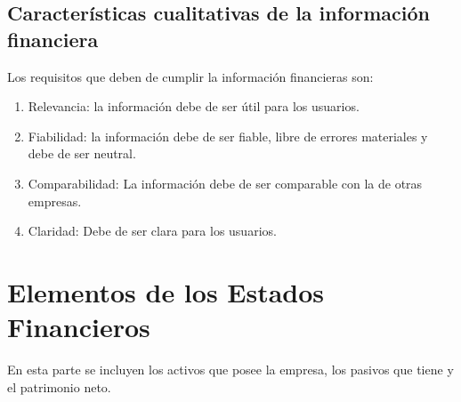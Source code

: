 \documentclass[a4paper,12pt]{article}
\begin{document}
\subsection{Características cualitativas de la información financiera}

Los requisitos que deben de cumplir la información financieras son:

\begin{enumerate}
    \item Relevancia: la información debe de ser útil para los usuarios.
    \item Fiabilidad: la información debe de ser fiable, libre de errores materiales y debe de ser neutral.
    \item Comparabilidad: La información debe de ser comparable con la de otras empresas.
    \item Claridad: Debe de ser clara para los usuarios.
\end{enumerate}


\section{Elementos de los Estados Financieros}

En esta parte se incluyen los activos que posee la empresa, los pasivos que tiene y el patrimonio neto.\\
\end{document}
